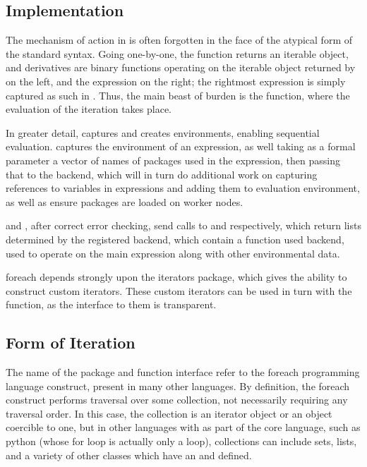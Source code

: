 \subsection{Implementation}\label{sec:implementation}

The mechanism of action in  is often forgotten in the face of the atypical form of the standard syntax.
Going one-by-one, the  function returns an iterable object,  and derivatives are binary functions operating on the iterable object returned by  on the left, and the expression on the right; the rightmost expression is simply captured as such in .
Thus, the main beast of burden is the  function, where the evaluation of the iteration takes place.

In greater detail,  captures and creates environments, enabling sequential evaluation.
 captures the
environment of an expression, as well taking as a formal parameter a
vector of names of packages used in the expression, then passing that
to the backend, which will in turn do additional work on capturing
references to variables in expressions and adding them to evaluation
environment, as well as ensure packages are loaded on worker nodes.

 and , after correct error checking,
send calls to  and
 respectively, which return
lists determined by the registered backend, which contain a function
used backend, used to operate on the main expression along with other
environmental data.

foreach depends strongly upon the iterators package, which gives the
ability to construct custom iterators.
These custom iterators can be used in turn with the  function, as the interface to them is transparent.

\subsection{Form of Iteration}\label{sec:form-iter}

The name of the package and function interface refer to the foreach programming language construct, present in many other languages.
By definition, the foreach construct performs traversal over some collection, not necessarily requiring any traversal order.
In this case, the collection is an iterator object or an object coercible to one, but in other languages with  as part of the core language, such as python (whose for loop is actually only a  loop), collections can include sets, lists, and a variety of other classes which have an  and  defined\cite{python2020iter}.

